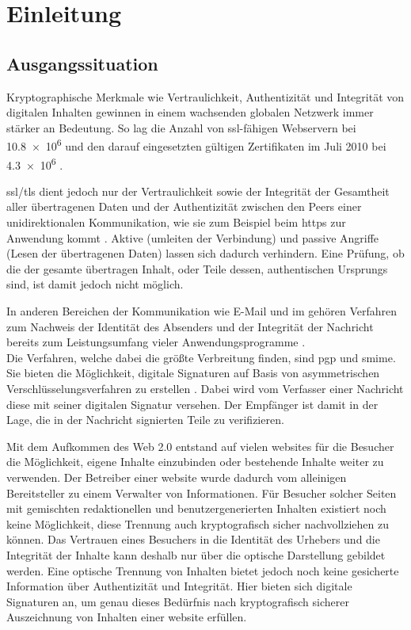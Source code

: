 
\chapter{Einleitung}
\label{chap:Einleitung}

\section{Ausgangssituation}
\label{sec:Einleitung:ausgangssituation}
Kryptographische Merkmale wie Vertraulichkeit, Authentizität und Integrität von digitalen Inhalten gewinnen in einem wachsenden globalen Netzwerk immer
stärker an Bedeutung. So lag die Anzahl von \gls{ssl}-fähigen Webservern bei \num{10.8e6} und den darauf eingesetzten gültigen Zertifikaten im Juli 2010 bei
\num{4.3e6} \cite{ssliverse:eff}.

\gls{ssl}/\gls{tls} dient jedoch nur der Vertraulichkeit sowie der Integrität der Gesamtheit aller übertragenen Daten und der Authentizität zwischen den Peers
einer unidirektionalen  Kommunikation, wie sie zum Beispiel beim \gls{https} zur Anwendung kommt \cite{kits}. Aktive (umleiten der Verbindung) und passive
Angriffe (Lesen der übertragenen Daten) lassen sich dadurch verhindern. Eine Prüfung, ob die der gesamte übertragen Inhalt, oder Teile dessen, authentischen
Ursprungs sind, ist damit jedoch nicht möglich.

In anderen Bereichen der Kommunikation wie E-Mail und \gls{im} gehören Verfahren zum Nachweis der Identität des Absenders und der Integrität der Nachricht
bereits zum Leistungsumfang vieler Anwendungsprogramme \cite{2719799020071101}.\\
Die Verfahren, welche dabei die größte Verbreitung finden, sind \gls{pgp} und \gls{smime}. Sie bieten die Möglichkeit, digitale Signaturen auf Basis von asymmetrischen
Verschlüsselungsverfahren zu erstellen \cite{kits}. Dabei wird vom Verfasser einer Nachricht diese mit seiner digitalen Signatur versehen. Der Empfänger ist damit
in der Lage, die in der Nachricht signierten Teile zu verifizieren.

Mit dem Aufkommen des Web 2.0 entstand auf vielen \glspl{website} für die Besucher die Möglichkeit, eigene Inhalte einzubinden oder bestehende Inhalte weiter zu
verwenden. Der Betreiber einer \gls{website} wurde dadurch vom alleinigen Bereitsteller zu einem Verwalter von Informationen. Für Besucher solcher Seiten mit
gemischten redaktionellen und benutzergenerierten Inhalten existiert noch keine Möglichkeit, diese Trennung auch kryptografisch sicher nachvollziehen zu können.
Das Vertrauen eines Besuchers in die Identität des Urhebers und die Integrität der Inhalte kann deshalb nur über die optische Darstellung gebildet werden. Eine
optische Trennung von Inhalten bietet jedoch noch keine gesicherte Information über Authentizität und Integrität. Hier bieten sich digitale Signaturen  an, um
genau dieses Bedürfnis nach kryptografisch sicherer Auszeichnung von Inhalten einer \gls{website} erfüllen.

